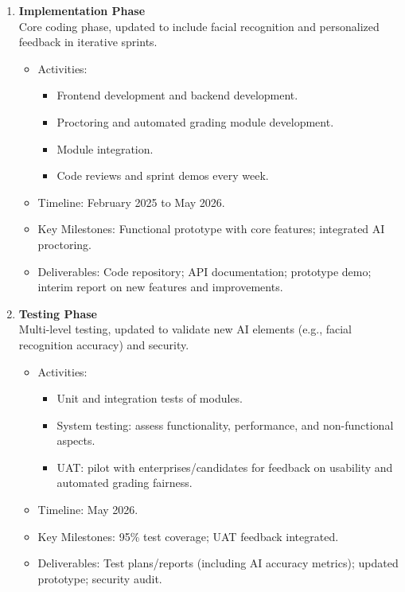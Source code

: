\begin{enumerate}[leftmargin=*,label=\textbf{\arabic*.}]
    \item \textbf{Implementation Phase}\\
    Core coding phase, updated to include facial recognition and personalized feedback in iterative sprints.
    \begin{itemize}[leftmargin=1.6em]
        \item Activities:
        \begin{itemize}[leftmargin=1.4em]
            \item Frontend development and backend development.
            \item Proctoring and automated grading module development.
            \item Module integration.
            \item Code reviews and sprint demos every week.
        \end{itemize}
        \item Timeline: February 2025 to May 2026.
        \item Key Milestones: Functional prototype with core features; integrated AI proctoring.
        \item Deliverables: Code repository; API documentation; prototype demo; interim report on new features and improvements.
    \end{itemize}

    \item \textbf{Testing Phase}\\
    Multi-level testing, updated to validate new AI elements (e.g., facial recognition accuracy) and security.
    \begin{itemize}[leftmargin=1.6em]
        \item Activities:
        \begin{itemize}[leftmargin=1.4em]
            \item Unit and integration tests of modules.
            \item System testing: assess functionality, performance, and non-functional aspects.
            \item UAT: pilot with enterprises/candidates for feedback on usability and automated grading fairness.
        \end{itemize}
        \item Timeline: May 2026.
        \item Key Milestones: 95\% test coverage; UAT feedback integrated.
        \item Deliverables: Test plans/reports (including AI accuracy metrics); updated prototype; security audit.
    \end{itemize}


\end{enumerate}
